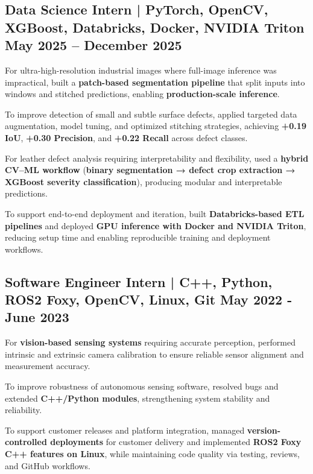 
\subsection{{Data Science Intern |  PyTorch, OpenCV, XGBoost, Databricks, Docker, NVIDIA Triton \hfill May 2025 -- December 2025}}
\begin{zitemize}
    \item For ultra-high-resolution industrial images where full-image inference was impractical, built a \textbf{patch-based segmentation pipeline} that split inputs into windows and stitched predictions, enabling \textbf{production-scale inference}.
    
    \item To improve detection of small and subtle surface defects, applied targeted data augmentation, model tuning, and optimized stitching strategies, achieving \textbf{+0.19 IoU}, \textbf{+0.30 Precision}, and \textbf{+0.22 Recall} across defect classes.
    
    \item For leather defect analysis requiring interpretability and flexibility, used a \textbf{hybrid CV--ML workflow} (\textbf{binary segmentation → defect crop extraction → XGBoost severity classification}), producing modular and interpretable predictions.
    
    \item To support end-to-end deployment and iteration, built \textbf{Databricks-based ETL pipelines} and deployed \textbf{GPU inference with Docker and NVIDIA Triton}, reducing setup time and enabling reproducible training and deployment workflows.

\end{zitemize}




\subsection{{Software Engineer Intern | C++, Python, ROS2 Foxy, OpenCV, Linux, Git \hfill May 2022 - June 2023}}
\begin{zitemize}
    \item For \textbf{vision-based sensing systems} requiring accurate perception, performed intrinsic and extrinsic camera calibration to ensure reliable sensor alignment and measurement accuracy.

    \item To improve robustness of autonomous sensing software, resolved bugs and extended \textbf{C++/Python modules}, strengthening system stability and reliability.

    \item To support customer releases and platform integration, managed \textbf{version-controlled deployments} for customer delivery and implemented \textbf{ROS2 Foxy C++ features on Linux}, while maintaining code quality via testing, reviews, and GitHub workflows.
\end{zitemize}


